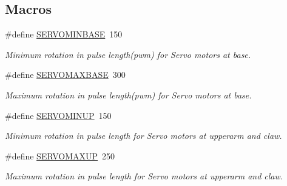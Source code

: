 \subsection*{Macros}
\begin{DoxyCompactItemize}
\item 
\hypertarget{_final___demo___code_8ino_ae3250e9bc1afb606a99abad6ff44da46}{\#define \hyperlink{_final___demo___code_8ino_ae3250e9bc1afb606a99abad6ff44da46}{S\-E\-R\-V\-O\-M\-I\-N\-B\-A\-S\-E}~150}\label{_final___demo___code_8ino_ae3250e9bc1afb606a99abad6ff44da46}

\begin{DoxyCompactList}\small\item\em Minimum rotation in pulse length(pwm) for Servo motors at base. \end{DoxyCompactList}\item 
\hypertarget{_final___demo___code_8ino_a9524d9255f4670136e1f56a03ed2337a}{\#define \hyperlink{_final___demo___code_8ino_a9524d9255f4670136e1f56a03ed2337a}{S\-E\-R\-V\-O\-M\-A\-X\-B\-A\-S\-E}~300}\label{_final___demo___code_8ino_a9524d9255f4670136e1f56a03ed2337a}

\begin{DoxyCompactList}\small\item\em Maximum rotation in pulse length(pwm) for Servo motors at base. \end{DoxyCompactList}\item 
\hypertarget{_final___demo___code_8ino_a9a8c5ba1c99c5777d9bc75eb786d67e5}{\#define \hyperlink{_final___demo___code_8ino_a9a8c5ba1c99c5777d9bc75eb786d67e5}{S\-E\-R\-V\-O\-M\-I\-N\-U\-P}~150}\label{_final___demo___code_8ino_a9a8c5ba1c99c5777d9bc75eb786d67e5}

\begin{DoxyCompactList}\small\item\em Minimum rotation in pulse length for Servo motors at upperarm and claw. \end{DoxyCompactList}\item 
\hypertarget{_final___demo___code_8ino_a1050c210d8a8e13e250166de25133129}{\#define \hyperlink{_final___demo___code_8ino_a1050c210d8a8e13e250166de25133129}{S\-E\-R\-V\-O\-M\-A\-X\-U\-P}~250}\label{_final___demo___code_8ino_a1050c210d8a8e13e250166de25133129}

\begin{DoxyCompactList}\small\item\em Maximum rotation in pulse length for Servo motors at upperarm and claw. \end{DoxyCompactList}\end{DoxyCompactItemize}
